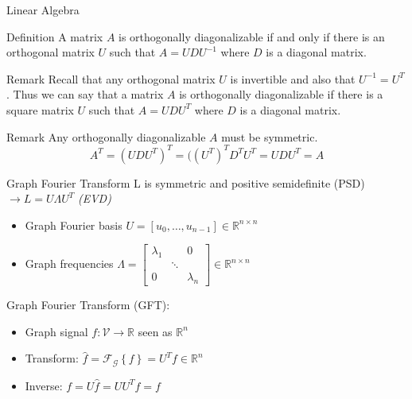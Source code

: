 \documentclass{beamer}
\begin{document}
\begin{frame}{Linear Algebra}
  \begin{block}{Definition}
    A matrix $A$ is orthogonally diagonalizable if and only if there
    is an orthogonal matrix $U$ such that $A = UDU^{-1}$ where $D$ is
    a diagonal matrix.
  \end{block}
  \begin{block}{Remark}
    Recall that any orthogonal matrix $U$ is invertible and also that
    $U^{-1}=U^T$. Thus we can say that a matrix $A$ is orthogonally
    diagonalizable if there is a square matrix $U$ such that $A=UDU^T$
    where $D$ is a diagonal matrix.
  \end{block}
  \begin{block}{Remark}
    Any orthogonally diagonalizable $A$ must be symmetric.
    \[
    A^T=(UDU^T)^T=((U^T)^TD^TU^T=UDU^T=A
    \]
  \end{block}
\end{frame}
\begin{frame}{Graph Fourier Transform}
  L is symmetric and positive semidefinite (PSD) $\rightarrow L=U
  \Lambda U^T$ \textit{(EVD)}
  \begin{itemize}
  \item Graph Fourier basis $U=\left[u_0, \dots, u_{n-1}\right] \in \mathbb{R}^{n \times n}$
  \item Graph frequencies $\Lambda =\begin{bmatrix} \lambda _{ 1 } &  & 0 \\  & \ddots  &  \\ 0 &  & \lambda _{ n } \end{bmatrix} \in \mathbb{R}^{n \times n}$
  \end{itemize}
  \vspace{1cm}
  Graph Fourier Transform (GFT):
  \begin{itemize}
  \item Graph signal $f: \mathcal{V} \rightarrow \mathbb{R}$ seen as $\mathbb{R}^n$
  \item Transform: $\hat{f} = \mathcal{F}_{\mathcal{G}}\left\{ f \right\} = U^Tf \in \mathbb{R}^n$
  \item Inverse: $f = U\hat{f} = UU^Tf = f$
  \end{itemize}
\end{frame}
\end{document}
